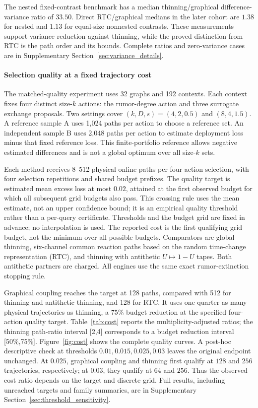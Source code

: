 \documentclass[preprint,11pt,sort&compress]{elsarticle}
\begin{document}
The nested fixed-contrast benchmark has a median thinning/graphical difference-variance ratio of $33.50$. Direct RTC/graphical medians in the later cohort are $1.38$ for nested and $1.13$ for equal-size nonnested contrasts. These measurements support variance reduction against thinning, while the proved distinction from RTC is the path order and its bounds. Complete ratios and zero-variance cases are in Supplementary Section~\ref{sec:variance_details}.

\paragraph{Selection quality at a fixed trajectory cost}
The matched-quality experiment uses 32 graphs and 192 contexts. Each context fixes four distinct size-$k$ actions: the rumor-degree action and three surrogate exchange proposals. Two settings cover $(k,D,s)=(4,2,0.5)$ and $(8,4,1.5)$. A reference sample A uses 1,024 paths per action to choose a reference set. An independent sample B uses 2,048 paths per action to estimate deployment loss minus that fixed reference loss. This finite-portfolio reference allows negative estimated differences and is not a global optimum over all size-$k$ sets.

Each method receives 8--512 physical online paths per four-action selection, with four selection repetitions and shared budget prefixes. The quality target is estimated mean excess loss at most $0.02$, attained at the first observed budget for which all subsequent grid budgets also pass. This crossing rule uses the mean estimate, not an upper confidence bound; it is an empirical quality threshold rather than a per-query certificate. Thresholds and the budget grid are fixed in advance; no interpolation is used. The reported cost is the first qualifying grid budget, not the minimum over all possible budgets. Comparators are global thinning, six-channel common reaction paths based on the random time-change representation (RTC), and thinning with antithetic $U\mapsto1-U$ tapes. Both antithetic partners are charged. All engines use the same exact rumor-extinction stopping rule.

Graphical coupling reaches the target at 128 paths, compared with 512 for thinning and antithetic thinning, and 128 for RTC. It uses one quarter as many physical trajectories as thinning, a 75\% budget reduction at the specified four-action quality target. Table~\ref{tab:cost} reports the multiplicity-adjusted ratios; the thinning path-ratio interval [2,4] corresponds to a budget reduction interval [50\%,75\%]. Figure~\ref{fig:cost} shows the complete quality curves. A post-hoc descriptive check at thresholds $0.01,0.015,0.025,0.03$ leaves the original endpoint unchanged. At $0.025$, graphical coupling and thinning first qualify at $128$ and $256$ trajectories, respectively; at $0.03$, they qualify at $64$ and $256$. Thus the observed cost ratio depends on the target and discrete grid. Full results, including unreached targets and family summaries, are in Supplementary Section~\ref{sec:threshold_sensitivity}.
\end{document}
